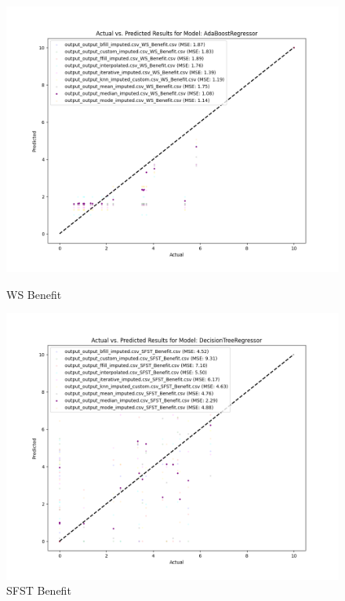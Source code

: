 \begin{figure}[H]
    \centering
    \begin{minipage}{0.495\textwidth}
        \centering
        \includegraphics[width=\linewidth]{reg_section_specxtra/images_reg_training/WS_Benefit_AdaBoostRegressor_plot.png}
        \caption{WS Benefit}
        \label{fig_reg_specxtra:ws_ben_reg_training}
    \end{minipage}\hfill
    \begin{minipage}{0.495\textwidth}
        \centering
        \includegraphics[width=\linewidth]{reg_section_specxtra/images_reg_training/SFST_Benefit_DecisionTreeRegressor_plot.png}
        \caption{SFST Benefit}
        \label{fig_reg_specxtra:sfst_ben_reg_training}
    \end{minipage}
\end{figure}